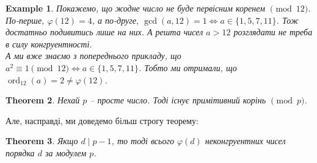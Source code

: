 \documentclass[a4paper, 14pt]{extarticle}
\theoremstyle{theoremdd}
\newtheorem{theorem}{Theorem}[subsection]
\theoremstyle{theoremdd}
\theoremstyle{theoremdd}
\theoremstyle{theoremdd}
\newtheorem{example}[theorem]{Example}
\theoremstyle{theoremdd}
\theoremstyle{theoremdd}
\theoremstyle{theoremdd}
\theoremstyle{theoremdd}
\DeclareMathOperator{\ord}{ord}
\begin{document}
\begin{example}
Покажемо, що жодне число не буде первісним коренем $\!\! \pmod {12}$.\\
По-перше, $\varphi(12) = 4$, а по-друге, $\gcd(a,12) = 1 \iff a \in \{1,5,7,11\}$. Тож достатньо подивитись лише на них. А решта чисел $a > 12$ розглядати не треба в силу конгруентності.\\
А ми вже знаємо з попереднього прикладу, що $a^2 \equiv 1 \pmod {12} \iff a \in \{1,5,7,11\}$. Тобто ми отримали, що $\ord_{12}(a) = 2 \neq \varphi(12)$.
\end{example}

\begin{theorem}
\label{primitive root (mod p)}
Нехай $p$ -- просте число. Тоді існує примітивний корінь $\pmod p$.
\end{theorem}

Але, насправді, ми доведемо більш строгу теорему:
\begin{theorem}
Якщо $d \mid p-1$, то тоді всього $\varphi(d)$ неконгруентних чисел порядка $d$ за модулем $p$.
\end{theorem}
\end{document}
